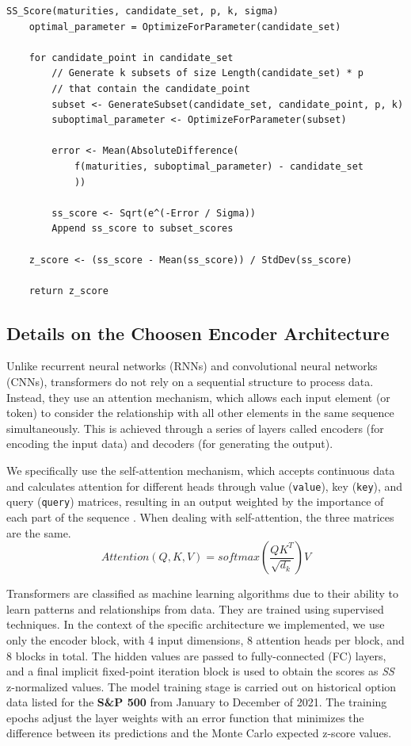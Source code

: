 \begin{lstlisting}[caption={The function $f$ calculates, for each maturity, the parameter's value using
		one of the equations at Eq. \ref{f_alpha}, \ref{f_rho} or \ref{f_nu}.},captionpos=b]
SS_Score(maturities, candidate_set, p, k, sigma)
	optimal_parameter = OptimizeForParameter(candidate_set)
	
	for candidate_point in candidate_set
		// Generate k subsets of size Length(candidate_set) * p
		// that contain the candidate_point
		subset <- GenerateSubset(candidate_set, candidate_point, p, k)
		suboptimal_parameter <- OptimizeForParameter(subset)
		
		error <- Mean(AbsoluteDifference(
			f(maturities, suboptimal_parameter) - candidate_set
			))
		
		ss_score <- Sqrt(e^(-Error / Sigma))
		Append ss_score to subset_scores
	
	z_score <- (ss_score - Mean(ss_score)) / StdDev(ss_score)
	
	return z_score	
\end{lstlisting}

\subsection{Details on the Choosen Encoder Architecture}

Unlike recurrent neural networks (RNNs) and convolutional neural networks (CNNs), transformers do not rely on a sequential structure to process data. Instead, they use an attention mechanism, which allows each input element (or token) to consider the relationship with all other elements in the same sequence simultaneously. This is achieved through a series of layers called encoders (for encoding the input data) and decoders (for generating the output).

We specifically use the self-attention mechanism, which accepts continuous data and calculates attention for different heads through value (\texttt{value}), key (\texttt{key}), and query (\texttt{query}) matrices, resulting in an output weighted by the importance of each part of the sequence \citep{Wen2023, Vaswani2023}. When dealing with self-attention, the three matrices are the same.
\begin{equation}
	\textit{Attention}(Q, K, V) = \textit{softmax}\left(\frac{QK^T}{\sqrt{d_k}}\right)V
\end{equation}

Transformers are classified as machine learning algorithms due to their ability to learn patterns and relationships from data. They are trained using supervised techniques. In the context of the specific architecture we implemented, we use only the encoder block, with 4 input dimensions, 8 attention heads per block, and 8 blocks in total. The hidden values are passed to fully-connected (FC) layers, and a final implicit fixed-point iteration block is used to obtain the scores as \textit{SS} z-normalized values. The model training stage is carried out on historical option data listed for the \textbf{S\&P 500} from January to December of 2021. The training epochs adjust the layer weights with an error function that minimizes the difference between its predictions and the Monte Carlo expected z-score values.

